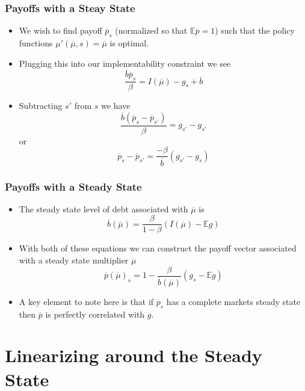 \documentclass{beamer}
\newcommand{\EE}{\mathbb E}
\newcommand{\pbar}{{\overline p}}
\newcommand{\bbar}{{\overline b}}
\newcommand{\mubar}{{\overline \mu}}
\begin{document}
\begin{frame}
	\frametitle{Payoffs with a Steay State}
	\begin{itemize}
		\item  We wish to find payoff $\overline p_s$ (normalized so that $\EE\pbar = 1$) such that the policy functions $\mu'(\mubar,s) = \mubar$ is optimal.
		\item  Plugging this into our implementability constraint we see
		\[
			\frac{\bbar \pbar_s}{\beta} = I(\mubar) - g_s + \bbar
		\]
		\item  Subtracting $s'$ from $s$ we have
		\[
			\frac{\bbar(\pbar_s-\pbar_{s'})}{\beta} = g_{s'}-g_{s'}
		\]or 
		\[
			\pbar_{s} - \pbar_{s'} = \frac{-\beta}{\bbar}(g_{s'} - g_s)
		\]
	\end{itemize}
\end{frame}

\begin{frame}
	\frametitle{Payoffs with a Steady State}
	\begin{itemize}
		\item  The steady state level of debt associated with $\mubar$ is 
		\[
			\bbar(\mubar) = \frac{\beta}{1-\beta}\left( I(\mubar) - \EE g\right)
		\]
		\item  With both of these equations we can construct the payoff vector associated with a steady state multiplier $\mubar$
		\[
			\pbar(\mubar)_s = 1-\frac{\beta}{\bbar(\mubar)}(g_s-\EE g)
		\]
		\item  A key element to note here is that if $\pbar_s$ has a complete markets steady state then $\pbar$ is perfectly correlated with $g$.
	\end{itemize}
\end{frame}
\section{Linearizing around the Steady State}
\end{document}
